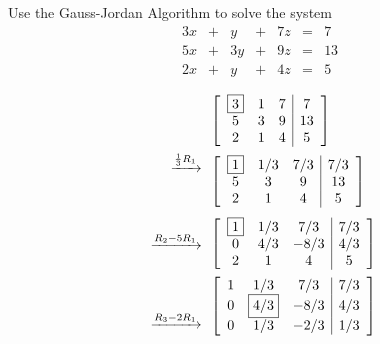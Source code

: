 \documentclass{ximera}
\begin{document}
\begin{example}\label{ex:gaussjordanalg}
Use the Gauss-Jordan Algorithm to solve the system
$$\begin{array}{ccccccccc}
      3x &+ &y&+&7z&= &7 \\
	 5x& +&3y&+&9z&=&13\\
      2x&+ &y&+&4z&=&5
    \end{array}$$
\begin{explanation}
\begin{align*}&\left[\begin{array}{ccc|c}  
 \fbox{$3$}&1&7&7\\5&3&9&13\\2&1&4&5
 \end{array}\right]\\
 \begin{array}{c}
  \xrightarrow{\frac{1}{3}R_1}\\
\\
\\
 \end{array}
 &\left[\begin{array}{ccc|c}  
 \fbox{$1$}&1/3&7/3&7/3\\5&3&9&13\\2&1&4&5
 \end{array}\right]\\
 \begin{array}{c}
 \\
 \xrightarrow{R_2-5R_1}\\
\\
\end{array}
&\left[\begin{array}{ccc|c}  
 \fbox{$1$}&1/3&7/3&7/3\\0&4/3&-8/3&4/3\\2&1&4&5
 \end{array}\right]\\
 \begin{array}{c}
  \\
\\
 \xrightarrow{R_3-2R_1}\\
\end{array}&\left[\begin{array}{ccc|c}  
 1&1/3&7/3&7/3\\0&\fbox{$4/3$}&-8/3&4/3\\0&1/3&-2/3&1/3
 \end{array}\right]\\
 \begin{array}{c}
\\

\end{array}
\end{align*}
\end{explanation}
\end{example}
\end{document}
